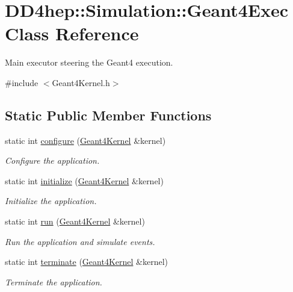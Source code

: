 \hypertarget{class_d_d4hep_1_1_simulation_1_1_geant4_exec}{}\section{D\+D4hep\+:\+:Simulation\+:\+:Geant4\+Exec Class Reference}
\label{class_d_d4hep_1_1_simulation_1_1_geant4_exec}


Main executor steering the Geant4 execution.  




{\ttfamily \#include $<$Geant4\+Kernel.\+h$>$}

\subsection*{Static Public Member Functions}
\begin{DoxyCompactItemize}
\item 
static int \hyperlink{class_d_d4hep_1_1_simulation_1_1_geant4_exec_a68d70832e5acb1c074ce12cae898af09}{configure} (\hyperlink{class_d_d4hep_1_1_simulation_1_1_geant4_kernel}{Geant4\+Kernel} \&kernel)
\begin{DoxyCompactList}\small\item\em Configure the application. \end{DoxyCompactList}\item 
static int \hyperlink{class_d_d4hep_1_1_simulation_1_1_geant4_exec_ae5486a8c520af49cbcc5d5ba4323e773}{initialize} (\hyperlink{class_d_d4hep_1_1_simulation_1_1_geant4_kernel}{Geant4\+Kernel} \&kernel)
\begin{DoxyCompactList}\small\item\em Initialize the application. \end{DoxyCompactList}\item 
static int \hyperlink{class_d_d4hep_1_1_simulation_1_1_geant4_exec_a006a064ae70aa7839d656ae7cdd8fc59}{run} (\hyperlink{class_d_d4hep_1_1_simulation_1_1_geant4_kernel}{Geant4\+Kernel} \&kernel)
\begin{DoxyCompactList}\small\item\em Run the application and simulate events. \end{DoxyCompactList}\item 
static int \hyperlink{class_d_d4hep_1_1_simulation_1_1_geant4_exec_a592e79f8ae539bd7491cd3af0572555c}{terminate} (\hyperlink{class_d_d4hep_1_1_simulation_1_1_geant4_kernel}{Geant4\+Kernel} \&kernel)
\begin{DoxyCompactList}\small\item\em Terminate the application. \end{DoxyCompactList}\end{DoxyCompactItemize}


